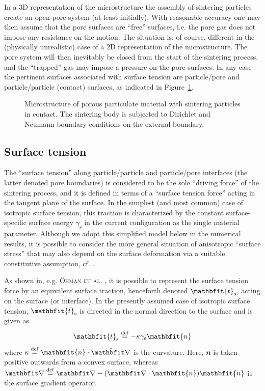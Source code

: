 \documentclass[10pt,a4paper,fleqn]{article}
\renewcommand{\ta}[1]{\mathbfit{#1}}
\newcommand{\figref}[1]{Figure~\ref{#1}}
\newcommand{\surf}{\mathrm{s}}
\begin{document}
In a 3D representation of the microstructure the assembly of sintering particles create an open pore system (at least initially). With reasonable accuracy one may then assume that the pore surfaces are ``free'' surfaces, i.e. the pore gas does not impose any resistance on the motion. The situation is, of course, different in the (physically unrealistic) case of a 2D representation of the microstructure. The pore system will then inevitably be closed from the start of the sintering process, and the ``trapped'' gas may impose a pressure on the pore surfaces. In any case the pertinent surfaces associated with surface tension are particle/pore and particle/particle (contact) surfaces, as indicated in \figref{fig:micro}.
\begin{figure}[th!]
    \centering
    
    \caption{Microstructure of porous particulate material with sintering particles in contact. The sintering body is subjected to Dirichlet and Neumann boundary conditions on the external boundary.}
    \label{fig:micro}
\end{figure}


\subsection{Surface tension}

The ``surface tension'' along particle/particle and particle/pore interfaces (the latter denoted pore boundaries) is considered to be the sole ``driving force'' of the sintering process, and it is defined in terms of a ``surface tension force'' acting in the tangent plane of the surface. In the simplest (and most common) case of isotropic surface tension, this traction is characterized by the constant surface-specific surface energy $\gamma_\surf$ in the current configuration as the single material parameter. Although we adopt this simplified model below in the numerical results, it is possible to consider the more general situation of anisotropic ``surface stress'' that may also depend on the surface deformation via a suitable constitutive assumption, cf. \cite{Steinmann2008:boundaryenergies}.

As shown in, e.g. \textsc{Öhman et al.} \cite{Ohman2011a}, it is possible to represent the surface tension force by an equivalent surface traction, henceforth denoted $\ta{t}_\fluct$, acting on the surface (or interface). In the presently assumed case of isotropic surface tension, $\ta{t}_\fluct$ is directed in the normal direction to the surface and is given as
\begin{equation}
    \ta{t}_\surf\defeq -\kappa\gamma_\surf\ta{n}
\label{eq103aKR}
\end{equation}
where $\kappa\defeq\ta{n}\cdot\hat{\diff}$ is the curvature. Here, $\ta{n}$ is taken positive outwards from a convex surface, whereas $\hat\diff \defeq \diff - (\diff\cdot\ta{n})\ta{n}$ is the surface gradient operator.
\end{document}
